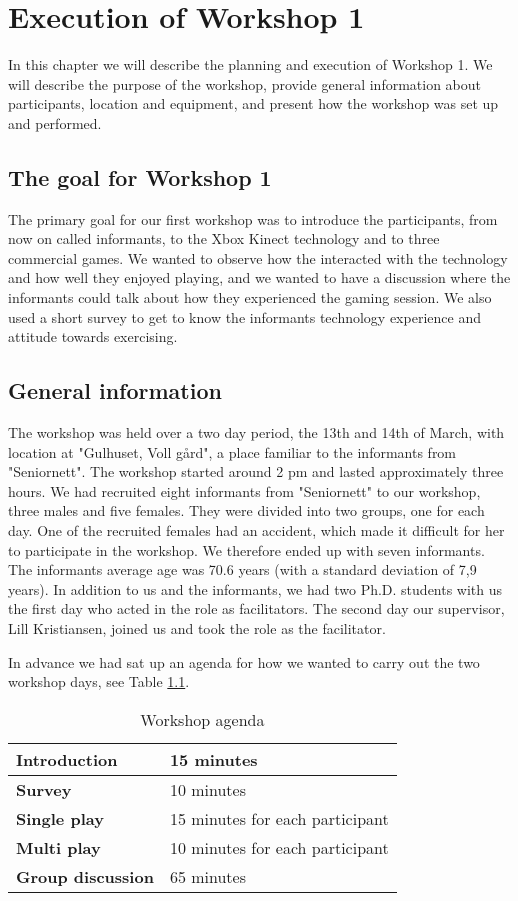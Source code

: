 \chapter{Execution of Workshop 1}
In this chapter we will describe the planning and execution of  Workshop 1. We will describe the purpose of the workshop, provide general information about participants, location and equipment, and present how the workshop was set up and performed. 

\section{The goal for Workshop 1}
The primary goal for our first workshop was to introduce the participants, from now on called informants, to the Xbox Kinect technology and to three commercial games. We wanted to observe how the interacted with the technology and how well they enjoyed playing, and we wanted to have a discussion where the informants could talk about how they experienced the gaming session. We also used a short survey to get to know the informants technology experience and attitude towards exercising.    

\section{General information}
The workshop was held over a two day period, the 13th and 14th of March, with location at "Gulhuset, Voll gård", a place familiar to the informants from "Seniornett". The workshop started around 2 pm and lasted approximately three hours. We had recruited eight informants from "Seniornett" to our workshop, three males and five females. They were divided into two groups, one for each day. One of the recruited females had an accident, which made it difficult for her to participate in the workshop. We therefore ended up with seven informants. The informants average age was 70.6 years (with a standard deviation of 7,9 years). In addition to us and the informants, we had two Ph.D. students with us the first day who acted in the role as facilitators. The second day our supervisor, Lill Kristiansen, joined us and took the role as the facilitator.   

In advance we had sat up an agenda for how we wanted to carry out the two workshop days, see Table \ref{tab:agenda}.  

\begin{table} [ht!]
\centering
    \begin{tabular}{|l|l|}
       \hline
       \textbf{Introduction} & 15 minutes  \\ \hline
       \textbf{Survey} & 10 minutes  \\ \hline
       \textbf{Single play} & 15 minutes for each participant \\ \hline
       \textbf{Multi play} & 10 minutes for each participant \\ \hline
	   \textbf{Group discussion} & 65 minutes \\ \hline
    \end{tabular}
    \caption[Workshop Agenda]{Workshop agenda}
    \label{tab:agenda}
\end{table} 

